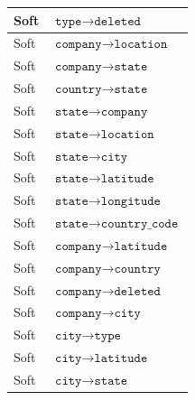 \documentclass{article}
\begin{document}
\begin{table}[ht]
\begin{tabular}{|p{}|p{}|}
                Soft & $\texttt{type} \rightarrow \texttt{deleted}$ \\ 
                \hline
                Soft & $\texttt{company} \rightarrow \texttt{location}$ \\ 
                \hline
                Soft & $\texttt{company} \rightarrow \texttt{state}$ \\ 
                \hline
                Soft & $\texttt{country} \rightarrow \texttt{state}$ \\ 
                \hline
                Soft & $\texttt{state} \rightarrow \texttt{company}$ \\ 
                \hline
                Soft & $\texttt{state} \rightarrow \texttt{location}$ \\ 
                \hline
                Soft & $\texttt{state} \rightarrow \texttt{city}$ \\ 
                \hline
                Soft & $\texttt{state} \rightarrow \texttt{latitude}$ \\ 
                \hline
                Soft & $\texttt{state} \rightarrow \texttt{longitude}$ \\ 
                \hline
                Soft & $\texttt{state} \rightarrow \texttt{country\_code}$ \\ 
                \hline
                Soft & $\texttt{company} \rightarrow \texttt{latitude}$ \\ 
                \hline
                Soft & $\texttt{company} \rightarrow \texttt{country}$ \\ 
                \hline
                Soft & $\texttt{company} \rightarrow \texttt{deleted}$ \\ 
                \hline
                Soft & $\texttt{company} \rightarrow \texttt{city}$ \\ 
                \hline
                Soft & $\texttt{city} \rightarrow \texttt{type}$ \\ 
                \hline
                Soft & $\texttt{city} \rightarrow \texttt{latitude}$ \\ 
                \hline
                Soft & $\texttt{city} \rightarrow \texttt{state}$ \\ 
                \hline

\end{tabular}
\end{table}
\end{document}
